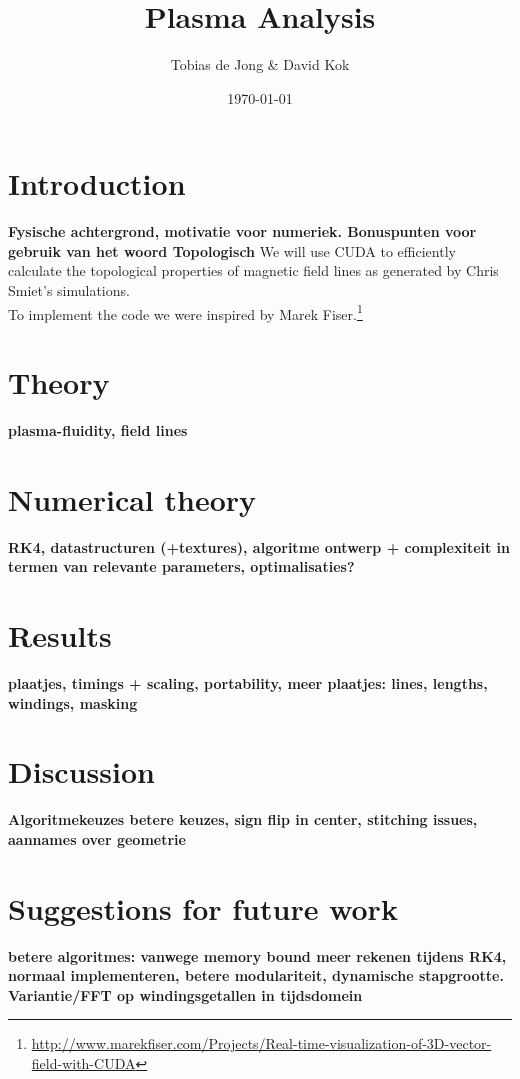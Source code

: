 \documentclass{article}
\begin{document}
\title{Plasma Analysis}
\author{Tobias de Jong \& David Kok}
\date{\today}
\maketitle
\section{Introduction}
{\bf Fysische achtergrond, motivatie voor numeriek. Bonuspunten voor gebruik van het woord Topologisch }
We will use CUDA to efficiently calculate the topological properties of magnetic field lines as generated by Chris Smiet's simulations.\cite{PhysRevLett.115.095001}\\
To implement the code we were inspired by Marek Fiser.\footnote{\url{http://www.marekfiser.com/Projects/Real-time-visualization-of-3D-vector-field-with-CUDA}}
\section{Theory}
{\bf plasma-fluidity, field lines }
\section{Numerical theory}
{\bf RK4, datastructuren (+textures), algoritme ontwerp + complexiteit in termen van relevante parameters, optimalisaties?}
\section{Results}
{\bf plaatjes, timings + scaling, portability, meer plaatjes: lines, lengths, windings, masking}
\section{Discussion}
{\bf Algoritmekeuzes \textrightarrow betere keuzes, sign flip in center, stitching issues, aannames over geometrie}
\section{Suggestions for future work}
{\bf betere algoritmes: vanwege memory bound meer rekenen tijdens RK4, normaal implementeren, betere modulariteit, dynamische stapgrootte. Variantie/FFT op windingsgetallen in tijdsdomein}


\end{document}
